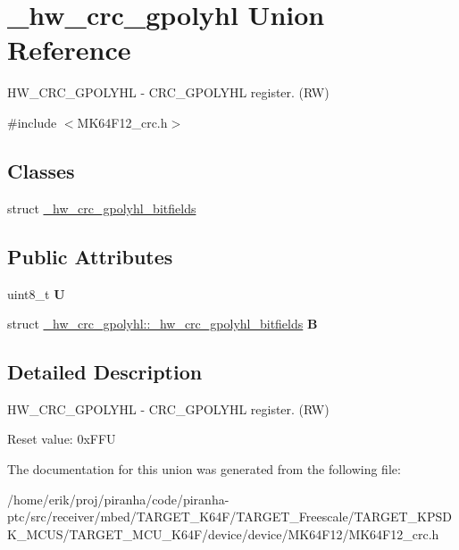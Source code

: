 \hypertarget{union__hw__crc__gpolyhl}{}\section{\+\_\+hw\+\_\+crc\+\_\+gpolyhl Union Reference}
\label{union__hw__crc__gpolyhl}


H\+W\+\_\+\+C\+R\+C\+\_\+\+G\+P\+O\+L\+Y\+HL -\/ C\+R\+C\+\_\+\+G\+P\+O\+L\+Y\+HL register. (RW)  




{\ttfamily \#include $<$M\+K64\+F12\+\_\+crc.\+h$>$}

\subsection*{Classes}
\begin{DoxyCompactItemize}
\item 
struct \hyperlink{struct__hw__crc__gpolyhl_1_1__hw__crc__gpolyhl__bitfields}{\+\_\+hw\+\_\+crc\+\_\+gpolyhl\+\_\+bitfields}
\end{DoxyCompactItemize}
\subsection*{Public Attributes}
\begin{DoxyCompactItemize}
\item 
uint8\+\_\+t {\bfseries U}\hypertarget{union__hw__crc__gpolyhl_afb12acc01feed55e164bf93efcb6c2a6}{}\label{union__hw__crc__gpolyhl_afb12acc01feed55e164bf93efcb6c2a6}

\item 
struct \hyperlink{struct__hw__crc__gpolyhl_1_1__hw__crc__gpolyhl__bitfields}{\+\_\+hw\+\_\+crc\+\_\+gpolyhl\+::\+\_\+hw\+\_\+crc\+\_\+gpolyhl\+\_\+bitfields} {\bfseries B}\hypertarget{union__hw__crc__gpolyhl_a864af1ed8d13223b852a01a98f8b2fb8}{}\label{union__hw__crc__gpolyhl_a864af1ed8d13223b852a01a98f8b2fb8}

\end{DoxyCompactItemize}


\subsection{Detailed Description}
H\+W\+\_\+\+C\+R\+C\+\_\+\+G\+P\+O\+L\+Y\+HL -\/ C\+R\+C\+\_\+\+G\+P\+O\+L\+Y\+HL register. (RW) 

Reset value\+: 0x\+F\+FU 

The documentation for this union was generated from the following file\+:\begin{DoxyCompactItemize}
\item 
/home/erik/proj/piranha/code/piranha-\/ptc/src/receiver/mbed/\+T\+A\+R\+G\+E\+T\+\_\+\+K64\+F/\+T\+A\+R\+G\+E\+T\+\_\+\+Freescale/\+T\+A\+R\+G\+E\+T\+\_\+\+K\+P\+S\+D\+K\+\_\+\+M\+C\+U\+S/\+T\+A\+R\+G\+E\+T\+\_\+\+M\+C\+U\+\_\+\+K64\+F/device/device/\+M\+K64\+F12/M\+K64\+F12\+\_\+crc.\+h\end{DoxyCompactItemize}
